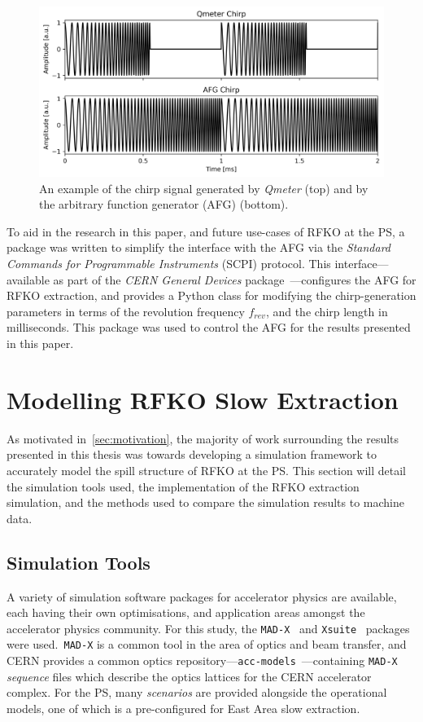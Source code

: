 \documentclass[11pt]{report}
\begin{document}
\begin{figure}
  \centering
  \includegraphics[width=0.6\linewidth]{both-chirps.png}
  \caption{An example of the chirp signal generated by \textit{Qmeter} (top) and by the arbitrary function generator (AFG) (bottom).}\label{eq:both-chirps}
\end{figure}

To aid in the research in this paper, and future use-cases of RFKO at the PS, a package was written to simplify the interface with the AFG via the \textit{Standard Commands for Programmable Instruments} (SCPI) protocol. This interface---available as part of the \textit{CERN General Devices} package~\cite{cgd}---configures the AFG for RFKO extraction, and provides a Python class for modifying the chirp-generation parameters in terms of the revolution frequency $f_{rev}$, and the chirp length in milliseconds. This package was used to control the AFG for the results presented in this paper.


\section{Modelling RFKO Slow Extraction}\label{sec:rfko_sim}

As motivated in~\autoref{sec:motivation}, the majority of work surrounding the results presented in this thesis was towards developing a simulation framework to accurately model the spill structure of RFKO at the PS. This section will detail the simulation tools used, the implementation of the RFKO extraction simulation, and the methods used to compare the simulation results to machine data.

\subsection{Simulation Tools}

A variety of simulation software packages for accelerator physics are available, each having their own optimisations, and application areas amongst the accelerator physics community. For this study, the \verb|MAD-X|~\cite{Iselin:MAD} and \verb|Xsuite|~\cite{xsuite} packages were used.~\verb|MAD-X| is a common tool in the area of optics and beam transfer, and CERN provides a common optics repository---\verb|acc-models|~\cite{optics_repo}---containing \verb|MAD-X| \textit{sequence} files which describe the optics lattices for the CERN accelerator complex. For the PS, many \textit{scenarios} are provided alongside the operational models, one of which is a pre-configured for East Area slow extraction.
\end{document}

